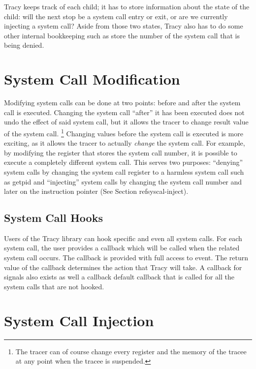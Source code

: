 \documentclass[a4paper, 10pt]{report}
\begin{document}
Tracy keeps track of each child; it has to store information about the state
of the child: will the next stop be a system call entry or exit, or are we
currently injecting a system call? Aside from those two states, Tracy also
has to do some other internal bookkeeping such as store the number of
the system call that is being denied.


\section{System Call Modification}

Modifying system calls can be done at two points: before and after the
system call is executed. Changing the system call ``after'' it has been executed
does not undo the effect of said system call, but it allows the tracer to change
result value of the system call.
\footnote{The tracer can of course change every register and the memory of the
tracee at any point when the tracee is suspended.}
Changing values before the system call is executed is more exciting, as it
allows the tracer to actually \textit{change} the system call. For example, by
modifying the register that stores the system call number, it is possible to
execute a completely different system call. This serves two purposes:
``denying'' system calls by changing the system call register to a harmless
system call such as getpid and ``injecting'' system calls by changing the
system call number and later on the instruction pointer (See Section
ref{syscal-inject}).

\subsection{System Call Hooks}

Users of the Tracy library can hook specific and even all system calls. For
each system call, the user provides a callback which will be called when
the related system call occurs. The callback is provided with full access to
event. The return value of the callback determines the action that Tracy
will take. A callback for signals also exists as well a callback default
callback that is called for all the system calls that are not hooked.

\section{System Call Injection}
\label{syscall-inject}
\end{document}
